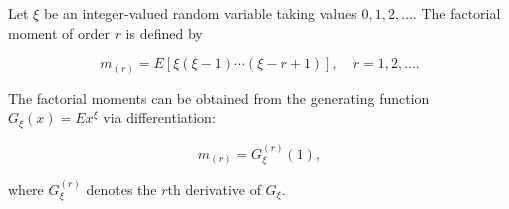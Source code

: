 Let $\xi$ be an integer-valued random variable taking values $0, 1, 2, \ldots$. The factorial moment of order $r$ is defined by

$$m_{(r)} = E[\xi(\xi - 1) \cdots (\xi - r + 1)], \quad r = 1, 2, \ldots.$$

The factorial moments can be obtained from the generating function $G_\xi(x) = E x^\xi$ via differentiation:

$$m_{(r)} = G_\xi^{(r)}(1),$$

where $G_\xi^{(r)}$ denotes the $r$th derivative of $G_\xi$.
